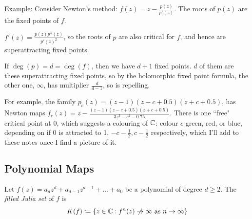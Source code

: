 \documentclass[10pt,a4paper]{article}
\begin{document}
\underline{Example:} Consider Newton's method: $f(z) = z - \frac{p(z)}{p'(z)}$. The roots of $p(z)$ are the fixed points of $f$.

$f'(z) = \frac{p(z)p''(z)}{p'(z)^2}$, so the roots of $p$ are also critical for $f$, and hence are superattracting fixed points.

If $\deg(p) = d = \deg(f)$, then we have $d+1$ fixed points. $d$ of them are these superattracting fixed points, so by the holomorphic fixed point formula, the other one, $\infty$, has multiplier $\frac{d}{d-1}$, so is repelling.

For example, the family $p_c(z) = (z-1)(z-c+0.5)(z+c+0.5)$, has Newton maps $f_c(z) = z-\frac{(z-1)(z-c+0.5)(z+c+0.5)}{3z^3-c^2-0.75}$. There is one ``free" critical point at 0, which suggests a colouring of $\mathbb{C}$: colour $c$ green, red, or blue, depending on if $0$ is attracted to 1, $-c-\frac12, c-\frac12$ respectively, which I'll add to these notes once I find a picture of it.
\subsection{Polynomial Maps}
\begin{definition}
  Let $f(z) = a_d z^d + a_{d-1}z^{d-1} +\ldots + a_0$ be a polynomial of degree $d \geq 2$. The \emph{filled Julia set} of $f$ is
  \[K(f) \coloneqq \{z \in \C : f^n(z) \centernot\to \infty \text{ as } n\to \infty\}\]
\end{definition}
\end{document}
